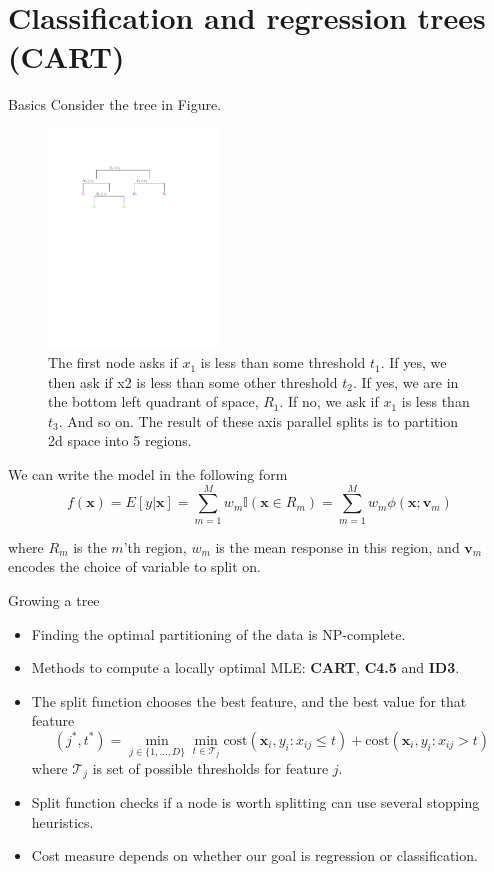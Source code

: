 \documentclass[10pt,mathserif]{beamer}
\begin{document}
\section{Classification and regression trees (CART)}
\begin{frame}{Basics}
Consider the tree in Figure.
\begin{figure}[h]
\centering
\includegraphics[width=0.4\textwidth]{regtree}
\caption{The first node asks if $x_1$ is less than some threshold $t_1$. If yes, we then ask if x2 is less than some other threshold $t_2$. If yes, we are in the bottom left quadrant of space, $R_1$. If no, we ask if $x_1$ is less than $t_3$. And so on. The result of these axis parallel splits is to partition 2d space into 5 regions.}
\end{figure}

We can write the model in the following form
\begin{equation*}
    f(\bm{x}) = E[y|\bm{x}] = \sum_{m=1}^M w_m \mathbb{I}(\bm{x} \in R_m) = \sum_{m=1}^M w_m \phi(\bm{x}; \bm{v}_m)
\end{equation*}

where $R_m$ is the $m$'th region, $w_m$ is the mean response in this region, and $\bm{v}_m$ encodes the choice of variable to split on.
\end{frame}

\begin{frame}{Growing a tree}
\begin{itemize}
    \item Finding the optimal partitioning of the data is NP-complete.
    \item Methods to compute a locally optimal MLE: \textbf{CART}, \textbf{C4.5} and \textbf{ID3}.
    \item  The split function chooses the best feature, and the best value for that feature
    \begin{equation*}
        (j^*, t^*) = \min_{j\in\{1,\ldots,D\}}\min_{t\in\mathcal{T}_j}\text{cost}({\bm{x}_i, y_i: x_{ij} \leq t}) + \text{cost}({\bm{x}_i, y_i: x_{ij}> t})
    \end{equation*}
    where $\mathcal{T}_j$ is set of possible thresholds for feature $j$.
    \item Split function checks if a node is worth splitting can use several stopping heuristics.
    \item Cost measure depends on whether our goal is regression or classification.
\end{itemize}
\end{frame}
\end{document}
